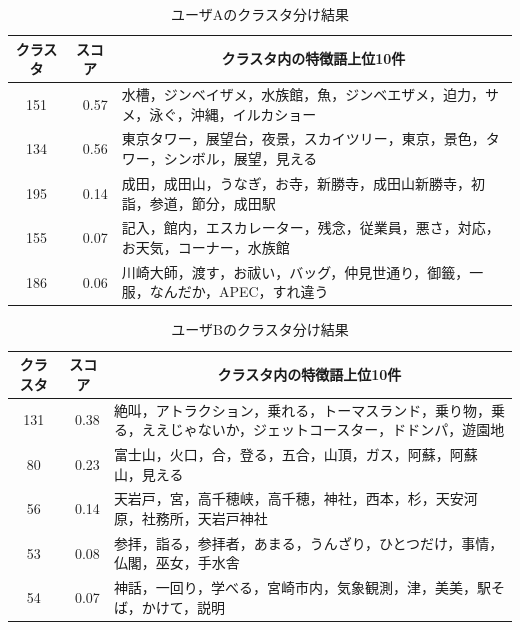 \documentclass{deimj}
\begin{document}
\begin{table}[t]
    \caption{ユーザAのクラスタ分け結果}
    \label{table:ユーザAのクラスタ分け結果}
    \centering
    \begin{tabular}{c|r|l}
    \hline
    \multicolumn{1}{c|}{クラスタ} & \multicolumn{1}{c|}{スコア} & \multicolumn{1}{c}{クラスタ内の特徴語上位10件}         \\ \hline
    151                       & 0.57                     & 水槽，ジンベイザメ，水族館，魚，ジンベエザメ，迫力，サメ，泳ぐ，沖縄，イルカショー  \\
    134                       & 0.56                     & 東京タワー，展望台，夜景，スカイツリー，東京，景色，タワー，シンボル，展望，見える  \\
    195                       & 0.14                     & 成田，成田山，うなぎ，お寺，新勝寺，成田山新勝寺，初詣，参道，節分，成田駅      \\
    155                       & 0.07                     & 記入，館内，エスカレーター，残念，従業員，悪さ，対応，お天気，コーナー，水族館    \\
    186                       & 0.06                     & 川崎大師，渡す，お祓い，バッグ，仲見世通り，御籤，一服，なんだか，APEC，すれ違う \\ \hline
    \end{tabular}
\end{table}

\begin{table}[t]
    \caption{ユーザBのクラスタ分け結果}
    \label{table:ユーザBのクラスタ分け結果}
    \centering
    \begin{tabular}{c|r|l}
    \hline
    \multicolumn{1}{c|}{クラスタ} & \multicolumn{1}{c|}{スコア} & \multicolumn{1}{c}{クラスタ内の特徴語上位10件}                       \\ \hline
    131                       & 0.38                     & 絶叫，アトラクション，乗れる，トーマスランド，乗り物，乗る，ええじゃないか，ジェットコースター，ドドンパ，遊園地 \\
    80                        & 0.23                     & 富士山，火口，合，登る，五合，山頂，ガス，阿蘇，阿蘇山，見える                          \\
    56                        & 0.14                     & 天岩戸，宮，高千穂峡，高千穂，神社，西本，杉，天安河原，社務所，天岩戸神社                    \\
    53                        & 0.08                     & 参拝，詣る，参拝者，あまる，うんざり，ひとつだけ，事情，仏閣，巫女，手水舎                    \\
    54                        & 0.07                     & 神話，一回り，学べる，宮崎市内，気象観測，津，美美，駅そば，かけて，説明                     \\ \hline
    \end{tabular}
\end{table}
\end{document}
